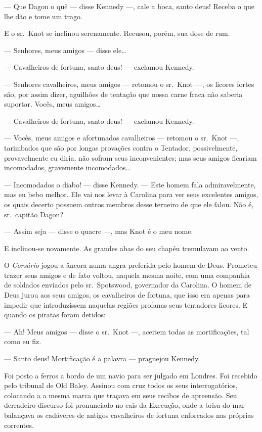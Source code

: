--- Que Dagon o quê --- disse Kennedy ---, cale a boca, santo deus! Receba o que
lhe dão e tome um trago.

E o sr.~Knot se inclinou serenamente. Recusou, porém, sua dose de rum.

--- Senhores, meus amigos --- disse ele\ldots{}

--- Cavalheiros de fortuna, santo deus! --- exclamou Kennedy.

--- Senhores cavalheiros, meus amigos --- retomou o sr.~Knot ---, os licores fortes
são, por assim dizer, aguilhões de tentação que nossa carne fraca não
saberia suportar. Vocês, meus amigos\ldots{}

--- Cavalheiros de fortuna, santo deus! --- exclamou Kennedy.

--- Vocês, meus amigos e afortunados cavalheiros --- retomou o sr.~Knot ---,
tarimbados que são por longas provações contra o Tentador, possivelmente,
provavelmente eu diria, não sofram seus inconvenientes; mas seus amigos
ficariam incomodados, gravemente incomodados\ldots{}

--- Incomodados o diabo! --- disse Kennedy. --- Este homem fala admiravelmente, mas
eu bebo melhor. Ele vai nos levar à Carolina para ver seus excelentes
amigos, os quais decerto possuem outros membros desse terneiro de que ele
falou. Não é, sr.~capitão Dagon?

--- Assim seja --- disse o quacre ---, mas Knot é o meu nome.

E inclinou-se novamente. As grandes abas do seu chapéu tremulavam ao vento.

O \textit{Corsário} jogou a âncora numa angra preferida pelo homem de Deus.
Prometeu trazer seus amigos e de fato voltou, naquela mesma noite, com uma
companhia de soldados enviados pelo sr.~Spotswood, governador da Carolina.
O homem de Deus jurou aos seus amigos, os cavalheiros de fortuna, que isso
era apenas para impedir que introduzissem naquelas regiões profanas seus
tentadores licores. E quando os piratas foram detidos:

--- Ah! Meus amigos --- disse o sr.~Knot ---, aceitem todas as mortificações, tal
como eu fiz.

--- Santo deus! Mortificação é a palavra --- praguejou Kennedy.

Foi posto a ferros a bordo de um navio para ser julgado em Londres. Foi
recebido pelo tribunal de Old Baley. Assinou com cruz todos os seus
interrogatórios, colocando a a mesma marca que traçava em seus recibos de
apreensão. Seu derradeiro discurso foi pronunciado no cais da Execução,
onde a brisa do mar balançava os cadáveres de antigos cavalheiros de
fortuna enforcados nas próprias correntes.


